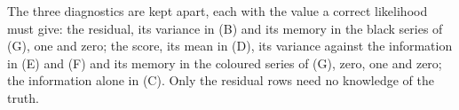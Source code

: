The three diagnostics are kept apart, each with the value a correct likelihood must give: the
residual, its variance in (B) and its memory in the black series of (G), one and zero; the score,
its mean in (D), its variance against the information in (E) and (F) and its memory in the coloured
series of (G), zero, one and zero; the information alone in (C). Only the residual rows need no
knowledge of the truth.


